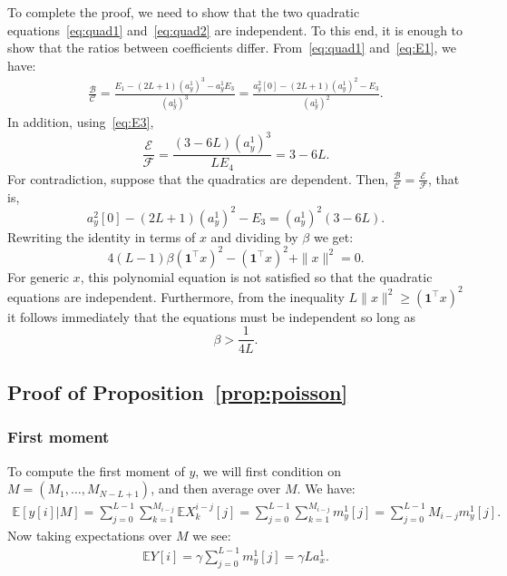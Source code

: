 \documentclass[12pt]{article}
\newcommand{\E}{\mathbb{E}}
\newcommand{\1}{\mathbf{1}}
\theoremstyle{plain}
\theoremstyle{definition}
\theoremstyle{remark}
\theoremstyle{plain}
\theoremstyle{remark}
\theoremstyle{plain}
\theoremstyle{plain}
\theoremstyle{plain}
\numberwithin{equation}{section}
\begin{document}
To complete the proof, we need to show that the two quadratic equations~\eqref{eq:quad1} and~\eqref{eq:quad2} are independent. To this end, it is enough to show that the ratios between coefficients differ. 
From~\eqref{eq:quad1} and~\eqref{eq:E1}, we have:
\begin{equation*}
\begin{split}
\frac{\mathcal{B}}{\mathcal{C}} = \frac{E_1 - (2L+1)(a_y^1)^3 - a_y^1E_3}{(a_y^1)^3} = \frac{a_y^2[0] - (2L+1)(a_y^1)^2 - E_3}{(a_y^1)^2}.
\end{split}
\end{equation*}
In addition, using~\eqref{eq:E3},
\begin{equation*}
\frac{\mathcal{E}}{\mathcal{F}} = \frac{(3-6L)(a_y^1)^3}{LE_4} = 3 - 6L . 
\end{equation*}
For contradiction, suppose that the quadratics are dependent. Then, $\frac{\mathcal{B}}{\mathcal{C}} =\frac{\mathcal{E}}{\mathcal{F}} $, that is, 	
\begin{equation*}
a_y^2[0] - (2L+1)(a_y^1)^2 - E_3 = (a_y^1)^2(3-6L).
\end{equation*}
Rewriting the identity in terms of $x$ and dividing by $\beta$ we get:
\begin{equation} \label{eq:cond}
4(L-1)\beta (\1^\top x)^2  - (\1^\top x)^2 + \|x\|^2 = 0.
\end{equation}	
For generic $x$,  this polynomial equation is not satisfied so that the quadratic equations are independent. 
Furthermore, from the inequality $L\|x\|^2 \ge (\1^\top x)^2$ it follows immediately that the equations must be independent so long as
\begin{equation*}
\beta > \frac{1}{4L}.
\end{equation*}

\subsection{Proof of Proposition~\ref{prop:poisson}} \label{sec:proof_prop_poisson}


\subsubsection{First moment}

To compute the first moment of $y$, we will first condition on $M = (M_1,\dots,M_{N-L+1})$, and then average over $M$. We have:
%
\begin{align}
%
\E[y[i] | M] = \sum_{j=0}^{L-1} \sum_{k=1}^{M_{i-j}} \E X_k^{i-j}[j]
= \sum_{j=0}^{L-1} \sum_{k=1}^{M_{i-j}} m_y^1[j]
= \sum_{j=0}^{L-1} M_{i-j} m_y^1[j].
%
\end{align}
%
Now taking expectations over $M$ we see:
%
\begin{align}
%
\E Y[i] = \gamma \sum_{j=0}^{L-1}  m_y^1[j] = \gamma La_x^1.
%
\end{align}
\end{document}
